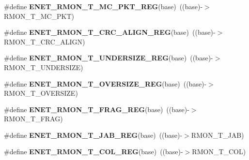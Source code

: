 \begin{DoxyCompactItemize}
\item 
\#define {\bfseries E\+N\+E\+T\+\_\+\+R\+M\+O\+N\+\_\+\+T\+\_\+\+M\+C\+\_\+\+P\+K\+T\+\_\+\+R\+EG}(base)~((base)-\/$>$R\+M\+O\+N\+\_\+\+T\+\_\+\+M\+C\+\_\+\+P\+KT)\hypertarget{group__ENET__Register__Accessor__Macros_gaf132ce38561efee8dd7ec4aaf527ddbd}{}\label{group__ENET__Register__Accessor__Macros_gaf132ce38561efee8dd7ec4aaf527ddbd}

\item 
\#define {\bfseries E\+N\+E\+T\+\_\+\+R\+M\+O\+N\+\_\+\+T\+\_\+\+C\+R\+C\+\_\+\+A\+L\+I\+G\+N\+\_\+\+R\+EG}(base)~((base)-\/$>$R\+M\+O\+N\+\_\+\+T\+\_\+\+C\+R\+C\+\_\+\+A\+L\+I\+GN)\hypertarget{group__ENET__Register__Accessor__Macros_ga2521a041515bcce7cd92afa6fd939b00}{}\label{group__ENET__Register__Accessor__Macros_ga2521a041515bcce7cd92afa6fd939b00}

\item 
\#define {\bfseries E\+N\+E\+T\+\_\+\+R\+M\+O\+N\+\_\+\+T\+\_\+\+U\+N\+D\+E\+R\+S\+I\+Z\+E\+\_\+\+R\+EG}(base)~((base)-\/$>$R\+M\+O\+N\+\_\+\+T\+\_\+\+U\+N\+D\+E\+R\+S\+I\+ZE)\hypertarget{group__ENET__Register__Accessor__Macros_ga61e2c617f8818e7842fea7ac621cdc48}{}\label{group__ENET__Register__Accessor__Macros_ga61e2c617f8818e7842fea7ac621cdc48}

\item 
\#define {\bfseries E\+N\+E\+T\+\_\+\+R\+M\+O\+N\+\_\+\+T\+\_\+\+O\+V\+E\+R\+S\+I\+Z\+E\+\_\+\+R\+EG}(base)~((base)-\/$>$R\+M\+O\+N\+\_\+\+T\+\_\+\+O\+V\+E\+R\+S\+I\+ZE)\hypertarget{group__ENET__Register__Accessor__Macros_gab3e72aa6c4f490664e6d23b5d7c5a2f6}{}\label{group__ENET__Register__Accessor__Macros_gab3e72aa6c4f490664e6d23b5d7c5a2f6}

\item 
\#define {\bfseries E\+N\+E\+T\+\_\+\+R\+M\+O\+N\+\_\+\+T\+\_\+\+F\+R\+A\+G\+\_\+\+R\+EG}(base)~((base)-\/$>$R\+M\+O\+N\+\_\+\+T\+\_\+\+F\+R\+AG)\hypertarget{group__ENET__Register__Accessor__Macros_gabb992bf7e3181b072bac550521847b7e}{}\label{group__ENET__Register__Accessor__Macros_gabb992bf7e3181b072bac550521847b7e}

\item 
\#define {\bfseries E\+N\+E\+T\+\_\+\+R\+M\+O\+N\+\_\+\+T\+\_\+\+J\+A\+B\+\_\+\+R\+EG}(base)~((base)-\/$>$R\+M\+O\+N\+\_\+\+T\+\_\+\+J\+AB)\hypertarget{group__ENET__Register__Accessor__Macros_gadaa7197b67f50c63f124fd9ebef16ae3}{}\label{group__ENET__Register__Accessor__Macros_gadaa7197b67f50c63f124fd9ebef16ae3}

\item 
\#define {\bfseries E\+N\+E\+T\+\_\+\+R\+M\+O\+N\+\_\+\+T\+\_\+\+C\+O\+L\+\_\+\+R\+EG}(base)~((base)-\/$>$R\+M\+O\+N\+\_\+\+T\+\_\+\+C\+OL)\hypertarget{group__ENET__Register__Accessor__Macros_ga09df12c321600bfd1f4668eef3e2ec38}{}\label{group__ENET__Register__Accessor__Macros_ga09df12c321600bfd1f4668eef3e2ec38}


\end{DoxyCompactItemize}
